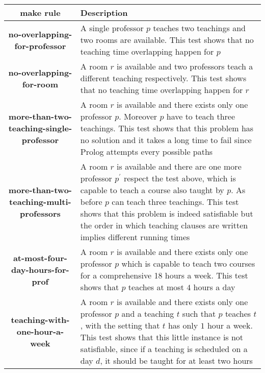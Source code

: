 \documentclass[10pt,a4paper]{article} %
\begin{document}
    \begin{table}
        \label{table:test-cases}
        \begin{tabular}{ c | p{6cm} }
            make rule & Description  \\
            \hline
            \textbf{no-overlapping-for-professor} & A single professor $p$
                teaches two teachings and two rooms are available.
                This test shows that no teaching time overlapping happen for $p$ \\
            \hline
            \textbf{no-overlapping-for-room} & A room $r$ is available and two
                professors teach a different teaching respectively.
                This test shows that no teaching time overlapping happen for $r$  \\
            \hline
            \textbf{more-than-two-teaching-single-professor} & A room $r$ is available and
                there exists only one professor $p$. Moreover $p$ have to teach three teachings.
                This test shows that this problem has no solution and it takes
                a long time to fail since Prolog attempts every possible paths \\
            \hline
            \textbf{more-than-two-teaching-multi-professors} & A room $r$ is available and
                there are one more professor $p^\prime$ respect the test above,
                which is capable to teach a course also taught by $p$.
                As before $p$ can teach three teachings.
                This test shows that this problem is indeed satisfiable but
                the order in which teaching clauses are written implies different
                running times \\
            \hline
            \textbf{at-most-four-day-hours-for-prof} & A room $r$ is available and
                there exists only one professor $p$
                which is capable to teach two courses for a comprehensive 18 hours
                a week. This test shows that $p$ teaches at most $4$ hours a day\\
            \hline
            \textbf{teaching-with-one-hour-a-week} & A room $r$ is available and
                there exists only one professor $p$ and a teaching $t$ such that
                $p$ teaches $t$, with the setting that $t$ has only $1$ hour a week.
                This test shows that this little instance is not satisfiable,
                since if a teaching is scheduled on a day $d$, it should be taught
                for at least two hours \\

\end{tabular}
\end{table}
\end{document}
